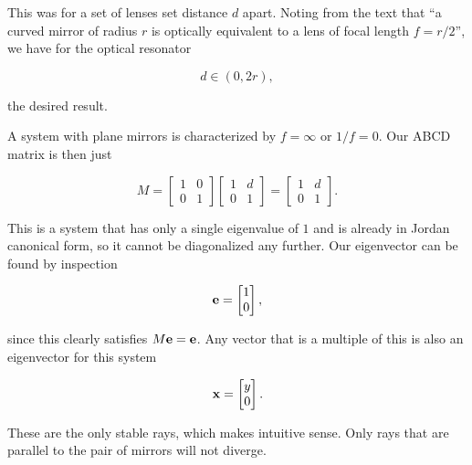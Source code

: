 {This was for a set of lenses set distance $d$ apart.  Noting from the text that ``a curved mirror of radius $r$ is optically equivalent to a lens of focal length $f = r/2$'', we have for the optical resonator

\begin{dmath}\label{eqn:problemSet4Problem2:1140}
\boxed{
d \in (0, 2 r),
}
\end{dmath}

the desired result.


A system with plane mirrors is characterized by $f = \infty$ or $1/f = 0$.  Our ABCD matrix is then just

\begin{equation}\label{eqn:problemSet4Problem2:1160}
M = 
\begin{bmatrix}
1 & 0 \\
0 & 1
\end{bmatrix}
\begin{bmatrix}
1 & d \\
0 & 1
\end{bmatrix}
=
\begin{bmatrix}
1 & d \\
0 & 1
\end{bmatrix}.
\end{equation}

This is a system that has only a single eigenvalue of $1$ and is already in Jordan canonical form, so it cannot be diagonalized any further.  Our eigenvector can be found by inspection

\begin{dmath}\label{eqn:problemSet4Problem2:640}
\Be = 
\begin{bmatrix}
1 \\
0 
\end{bmatrix},
\end{dmath}

since this clearly satisfies $M \mathbf{e} = \mathbf{e}$.  Any vector that is a multiple of this is also an eigenvector for this system

\begin{dmath}\label{eqn:problemSet4Problem2:660}
\Bx = 
\begin{bmatrix}
y \\ 
0
\end{bmatrix}.
\end{dmath}

These are the only stable rays, which makes intuitive sense.  Only rays that are parallel to the pair of mirrors will not diverge.

}

